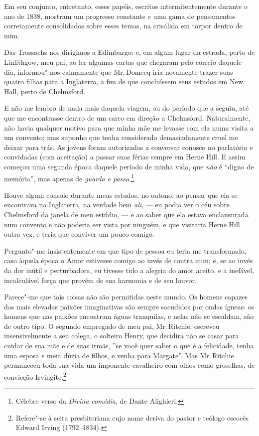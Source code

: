 Em seu conjunto, entretanto, esses papéis, escritos intermitentemente
durante o ano de 1838, mostram um progresso constante e uma gama de
pensamentos corretamente consolidados sobre esses temas, na crisálida em
torpor dentro de mim.

Das Trossachs nos dirigimos a Edimburgo: e, em algum lugar da
estrada, perto de Linlithgow, meu pai, ao ler algumas cartas que
chegaram pelo correio daquele dia, informou"-nos calmamente que Mr.\,Domecq
iria novamente trazer suas quatro filhas para a Inglaterra, a fim de que
concluíssem seus estudos em New Hall, perto de Chelmsford.

E não me lembro de nada mais daquela viagem, ou do período que a seguiu,
até que me encontrasse dentro de um carro em direção a Chelmsford.
Naturalmente, não havia qualquer motivo para que minha mãe me
levasse com ela numa visita a um convento; mas suponho que tenha
considerado demasiadamente cruel me deixar para trás. As jovens foram
autorizadas a conversar conosco no parlatório e convidadas (com
aceitação) a passar suas férias sempre em Herne Hill. E assim começou
uma segunda época daquele período de minha vida, que \textit{não} é
``digno de memória'', mas apenas de \textit{guarda e passa}.\footnote{Célebre
  verso da \textit{Divina comédia}, de Dante Alighieri.}

Houve algum consolo durante meus estudos, no outono, ao pensar que ela
se encontrava na Inglaterra, na verdade bem \textit{ali}, --- eu podia ver
o céu sobre Chelmsford da janela de meu estúdio, --- e ao saber que ela
estava enclausurada num convento e não poderia ser vista por ninguém, e
que visitaria Herne Hill outra vez, e teria que conviver um pouco
comigo.

Pergunto"-me insistentemente em que tipo de pessoa eu teria me
transformado, caso àquela época o Amor estivesse comigo ao invés de
contra mim; e, se ao invés da dor inútil e perturbadora, eu tivesse tido
a alegria do amor aceito, e a inefável, incalculável força que provém de
sua harmonia e de seu louvor.

Parece"-me que tais coisas não são permitidas neste mundo. Os homens
capazes das mais elevadas paixões imaginativas são sempre sacudidos por
ondas ígneas: os homens que nas paixões encontram águas tranquilas, e
nelas não se escaldam, são de outro tipo. O segundo empregado de meu
pai, Mr.\,Ritchie, escreveu insensivelmente a seu colega, o solteiro
Henry, que decidira não se casar para cuidar de sua mãe e de suas irmãs,
''se você quer saber o que é a felicidade, tenha uma esposa e meia dúzia
de filhos, e venha para Margate''. Mas Mr.\,Ritchie permaneceu toda sua
vida um imponente cavalheiro com olhos como groselhas, de convicção
Irvingite.\footnote{Refere"-se à seita presbiteriana cujo nome deriva do
  pastor e teólogo escocês Edward Irving (1792--1834).}

